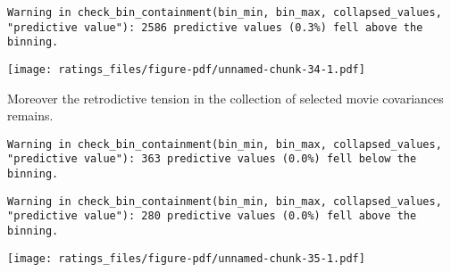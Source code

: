 \documentclass[
  letterpaper,
  DIV=11,
  numbers=noendperiod]{scrartcl}
\newenvironment{Shaded}{\begin{snugshade}}{\end{snugshade}}
\newcommand{\AttributeTok}[1]{\textcolor[rgb]{0.40,0.45,0.13}{#1}}
\newcommand{\DecValTok}[1]{\textcolor[rgb]{0.68,0.00,0.00}{#1}}
\newcommand{\FloatTok}[1]{\textcolor[rgb]{0.68,0.00,0.00}{#1}}
\newcommand{\FunctionTok}[1]{\textcolor[rgb]{0.28,0.35,0.67}{#1}}
\newcommand{\NormalTok}[1]{\textcolor[rgb]{0.00,0.23,0.31}{#1}}
\newcommand{\OtherTok}[1]{\textcolor[rgb]{0.00,0.23,0.31}{#1}}
\newcommand{\SpecialCharTok}[1]{\textcolor[rgb]{0.37,0.37,0.37}{#1}}
\newcommand{\StringTok}[1]{\textcolor[rgb]{0.13,0.47,0.30}{#1}}
\begin{document}
\begin{verbatim}
Warning in check_bin_containment(bin_min, bin_max, collapsed_values,
"predictive value"): 2586 predictive values (0.3%) fell above the binning.
\end{verbatim}

\texttt{[image: ratings\_files/figure-pdf/unnamed-chunk-34-1.pdf]}

Moreover the retrodictive tension in the collection of selected movie
covariances remains.

\begin{Shaded}
\end{Shaded}

\begin{verbatim}
Warning in check_bin_containment(bin_min, bin_max, collapsed_values,
"predictive value"): 363 predictive values (0.0%) fell below the binning.
\end{verbatim}

\begin{verbatim}
Warning in check_bin_containment(bin_min, bin_max, collapsed_values,
"predictive value"): 280 predictive values (0.0%) fell above the binning.
\end{verbatim}

\texttt{[image: ratings\_files/figure-pdf/unnamed-chunk-35-1.pdf]}
\end{document}
